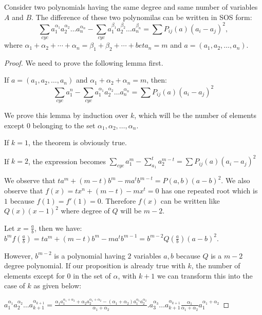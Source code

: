 \begin{theorem}
  Consider two polynomials having the same degree and same number of variables $A$ and $B$. The difference of these two polynomilas
  can be written in SOS form:
  $$\sum_{cyc}a_1^{\alpha_1}a_2^{\alpha_2}\ldots a_n^{\alpha_n} - \sum_{cyc}a_1^{\beta_1}a_2^{\beta_2}\ldots a_n^{\beta_n} = \sum
  P_{ij}(a)(a_i - a_j)^2,$$
  where $\alpha_1 + \alpha_2 + \cdots + \alpha_n = \beta_1 + \beta_2 + \cdots + beta_n = m$ and $a = (a_1, a_2, \ldots,
  a_n)$.
\end{theorem}

\begin{proof}
  We need to prove the following lemma first.
  \begin{lemma}
    If $a = (a_1, a_2, \ldots, a_n)$ and $\alpha_1 + \alpha_2 + \alpha_n = m$, then:
    $$\sum_{cyc}a_1^n - \sum_{cyc}a_1^{\alpha_1}a_2^{\alpha_2}\ldots a_n^{\alpha_n} = \sum P_{ij}(a)(a_i - a_j)^2$$
  \end{lemma}
  We prove this lemma by induction over $k$, which will be the number of elements except $0$ belonging to the set ${\alpha_1,
    \alpha_2, \ldots, \alpha_n}$.

  If $k = 1$, the theorem is obviously true.

  If $k = 2$, the expression becomes $\sum_{cyc}a_1^m - \sum_{a_1}^ta_2^{m - t} = \sum P_{ij}(a)(a_i - a_j)^2$

  We observe that $ta^m + (m - t)b^m - ma^tb^{m - t} = P(a, b)(a - b)^2$. We also observe that $f(x) = tx^n + (m - t) - mx^t = 0$
  has one repeated root which is $1$ because $f(1) = f'(1) = 0$. Therefore $f(x)$ can be written like $Q(x)(x - 1)^2$ where degree
  of $Q$ will be $m - 2$.

  Let $x = \frac{a}{b}$, then we have: $b^mf\left(\frac{a}{b}\right) = ta^m + (m - t)b^m - ma^tb^{m - 1} = b^{m -
    2}Q\left(\frac{a}{b}\right)(a - b)^2$.

  However, $b^{m - 2}$ is a polynomial having $2$ variables $a, b$ because $Q$ is a $m - 2$ degree polynomial. If our proposition
  is already true with $k$, the number of elements except for $0$ in the set of $\alpha$, with $k + 1$ we can transform this into
  the case of $k$ as given below:

  $a_1^{\alpha_1}a_2^{\alpha_2}\ldots a_{k+1}^{\alpha_{k +1}} = \frac{\alpha_1a_1^{\alpha_1 + \alpha_2} + \alpha_2a_2^{\alpha_1 +
      \alpha_2} - (\alpha_1 + \alpha_2)a_1^{\alpha_1}a_2^{\alpha_2}}{\alpha_1 + \alpha_2}.a_3^{\alpha_3}\ldots a_{k+1}^{\alpha_{k
    +1}}\frac{\alpha_1}{\alpha_1 + \alpha_2}a_1^{\alpha_1+\alpha_2}$


\end{proof}
